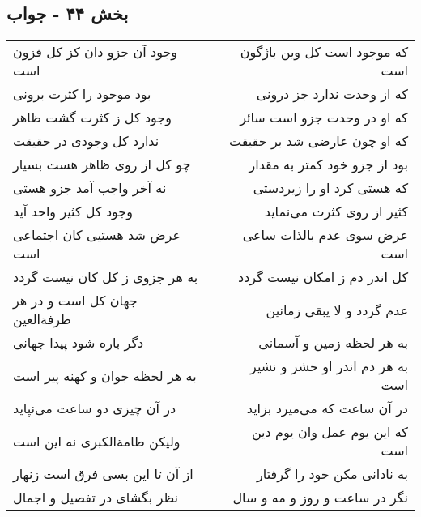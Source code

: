 \begin{center}
\section*{بخش ۴۴ - جواب}
\label{sec:sh044}
\begin{longtable}{l p{0.5cm} r}
وجود آن جزو دان کز کل فزون است
&&
که موجود است کل وین باژگون است
\\
بود موجود را کثرت برونی
&&
که از وحدت ندارد جز درونی
\\
وجود کل ز کثرت گشت ظاهر
&&
که او در وحدت جزو است سائر
\\
ندارد کل وجودی در حقیقت
&&
که او چون عارضی شد بر حقیقت
\\
چو کل از روی ظاهر هست بسیار
&&
بود از جزو خود کمتر به مقدار
\\
نه آخر واجب آمد جزو هستی
&&
که هستی کرد او را زیردستی
\\
وجود کل کثیر واحد آید
&&
کثیر از روی کثرت می‌نماید
\\
عرض شد هستیی کان اجتماعی است
&&
عرض سوی عدم بالذات ساعی است
\\
به هر جزوی ز کل کان نیست گردد
&&
کل اندر دم ز امکان نیست گردد
\\
جهان کل است و در هر طرفةالعین
&&
عدم گردد و لا یبقی زمانین
\\
دگر باره شود پیدا جهانی
&&
به هر لحظه زمین و آسمانی
\\
به هر لحظه جوان و کهنه پیر است
&&
به هر دم اندر او حشر و نشیر است
\\
در آن چیزی دو ساعت می‌نپاید
&&
در آن ساعت که می‌میرد بزاید
\\
ولیکن طامةالکبری نه این است
&&
که این یوم عمل وان یوم دین است
\\
از آن تا این بسی فرق است زنهار
&&
به نادانی مکن خود را گرفتار
\\
نظر بگشای در تفصیل و اجمال
&&
نگر در ساعت و روز و مه و سال
\\
\end{longtable}
\end{center}
